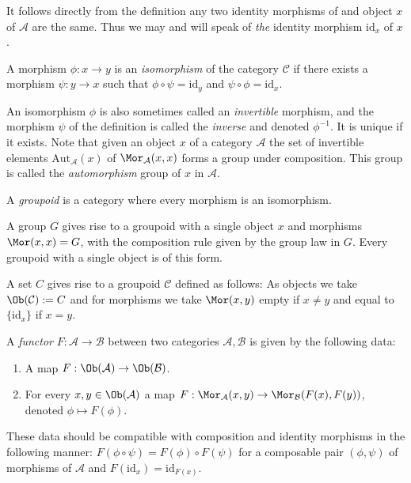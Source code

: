 \begin{remark}
\label{remark-unique-indentity}
It follows directly from the definition any two identity morphisms
of and object $x$ of $\mathcal{A}$ are the same. Thus we may and will
speak of {\it the} identity morphism $\text{id}_x$ of $x$.
\end{remark}

\begin{definition}
\label{definition-isomorphism}
A morphism $\phi : x \to y$ is an {\it isomorphism} of the category
$\mathcal{C}$ if there exists a morphism $\psi : y \to x$
such that $\phi \circ \psi = \text{id}_y$ and
$\psi \circ \phi = \text{id}_x$.
\end{definition}

\noindent
An isomorphism $\phi$ is also sometimes called an {\it invertible}
morphism, and the morphism $\psi$ of the definition is called the
{\it inverse} and denoted $\phi^{-1}$. It is unique if it exists. Note that
given an object $x$ of a category $\mathcal{A}$ the set of invertible
elements $\text{Aut}_\mathcal{A}(x)$
of $\Mor_\mathcal{A}(x, x)$ forms a group under composition.
This group is called the {\it automorphism} group of $x$ in $\mathcal{A}$.

\begin{definition}
\label{definition-groupoid}
A {\it groupoid} is a category where every morphism is an isomorphism.
\end{definition}

\begin{example}
\label{example-group-groupoid}
A group $G$ gives rise to a groupoid with a single object $x$
and morphisms $\Mor(x, x) = G$, with the composition rule
given by the group law in $G$. Every groupoid with a single
object is of this form.
\end{example}

\begin{example}
\label{example-set-groupoid}
A set $C$ gives rise to a groupoid $\mathcal{C}$ defined as follows:
As objects we take $\Ob(\mathcal{C}) := C$ and for morphisms
we take $\Mor(x, y)$ empty if $x\neq y$ and equal to
$\{\text{id}_x\}$ if $x = y$.
\end{example}

\begin{definition}
\label{definition-functor}
A {\it functor} $F : \mathcal{A} \to \mathcal{B}$
between two categories $\mathcal{A}, \mathcal{B}$ is given by the
following data:
\begin{enumerate}
\item A map $F : \Ob(\mathcal{A}) \to \Ob(\mathcal{B})$.
\item For every $x, y \in \Ob(\mathcal{A})$ a map
$F : \Mor_\mathcal{A}(x, y) \to \Mor_\mathcal{B}(F(x), F(y))$,
denoted $\phi \mapsto F(\phi)$.
\end{enumerate}
These data should be compatible with composition and identity morphisms
in the following manner: $F(\phi \circ \psi) =
F(\phi) \circ F(\psi)$ for a composable pair $(\phi, \psi)$ of
morphisms of $\mathcal{A}$ and $F(\text{id}_x) = \text{id}_{F(x)}$.
\end{definition}

